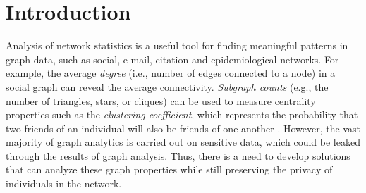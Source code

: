 \section{Introduction}
\label{sec:intro}


Analysis of network statistics is a useful tool for finding meaningful patterns in graph data, such as social, e-mail,  citation and epidemiological networks. 
For example, the average \textit{degree} (i.e., number of edges connected to a node) in a social graph can reveal the average connectivity. 
\textit{Subgraph counts} 
(e.g., the number of triangles, stars, or cliques) can be used to measure 
centrality properties such as the \textit{clustering coefficient}, 
which represents the probability that two friends of an individual will also be friends of one another \cite{Newman_PRL09}. 
However, the vast majority of graph analytics is carried out on sensitive data, which could be leaked through the results of graph analysis. Thus, there is a need to develop solutions that can analyze these graph properties while still preserving the privacy of 
individuals 
in the network.


